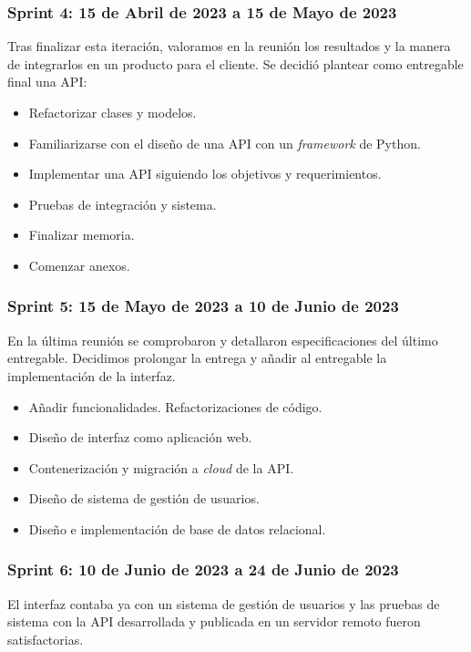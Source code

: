 \subsubsection{Sprint 4: 15 de Abril de 2023 a 15 de Mayo de 2023}

Tras finalizar esta iteración, valoramos en la reunión los resultados y la manera de integrarlos en un producto para el cliente.
Se decidió plantear como entregable final una API:

\begin{itemize}
    \item Refactorizar clases y modelos.
    \item Familiarizarse con el diseño de una API con un \textit{framework} de Python.
    \item Implementar una API siguiendo los objetivos y requerimientos.
    \item Pruebas de integración y sistema.
    \item Finalizar memoria. 
    \item Comenzar anexos.
\end{itemize}

\subsubsection{Sprint 5: 15 de Mayo de 2023 a 10 de Junio de 2023}

En la última reunión se comprobaron y detallaron especificaciones del último entregable. Decidimos prolongar la entrega y añadir al entregable la implementación de la interfaz.

\begin{itemize}
    \item Añadir funcionalidades. Refactorizaciones de código.
    \item Diseño de interfaz como aplicación web.
    \item Contenerización y migración a \textit{cloud} de la API.
    \item Diseño de sistema de gestión de usuarios.
    \item Diseño e implementación de base de datos relacional.
\end{itemize}

\subsubsection{Sprint 6: 10 de Junio de 2023 a 24 de Junio de 2023}

El interfaz contaba ya con un sistema de gestión de usuarios y las pruebas de sistema con la API desarrollada y publicada en un servidor remoto fueron satisfactorias.

